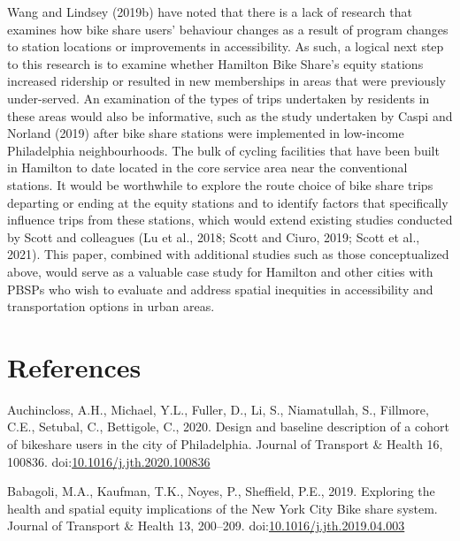 \documentclass[]{elsarticle} %
\begin{document}
Wang and Lindsey (2019b) have noted that there is a lack of research
that examines how bike share users' behaviour changes as a result of
program changes to station locations or improvements in accessibility.
As such, a logical next step to this research is to examine whether
Hamilton Bike Share's equity stations increased ridership or resulted in
new memberships in areas that were previously under-served. An
examination of the types of trips undertaken by residents in these areas
would also be informative, such as the study undertaken by Caspi and
Norland (2019) after bike share stations were implemented in low-income
Philadelphia neighbourhoods. The bulk of cycling facilities that have
been built in Hamilton to date located in the core service area near the
conventional stations. It would be worthwhile to explore the route
choice of bike share trips departing or ending at the equity stations
and to identify factors that specifically influence trips from these
stations, which would extend existing studies conducted by Scott and
colleagues (Lu et al., 2018; Scott and Ciuro, 2019; Scott et al., 2021).
This paper, combined with additional studies such as those
conceptualized above, would serve as a valuable case study for Hamilton
and other cities with PBSPs who wish to evaluate and address spatial
inequities in accessibility and transportation options in urban areas.

\hypertarget{references}{%
\section*{References}\label{references}}

\hypertarget{refs}{}
\leavevmode\hypertarget{ref-auchinclossDesignBaselineDescription2020}{}%
Auchincloss, A.H., Michael, Y.L., Fuller, D., Li, S., Niamatullah, S.,
Fillmore, C.E., Setubal, C., Bettigole, C., 2020. Design and baseline
description of a cohort of bikeshare users in the city of Philadelphia.
Journal of Transport \& Health 16, 100836.
doi:\href{https://doi.org/10.1016/j.jth.2020.100836}{10.1016/j.jth.2020.100836}

\leavevmode\hypertarget{ref-babagoliExploringHealthSpatial2019}{}%
Babagoli, M.A., Kaufman, T.K., Noyes, P., Sheffield, P.E., 2019.
Exploring the health and spatial equity implications of the New York
City Bike share system. Journal of Transport \& Health 13, 200--209.
doi:\href{https://doi.org/10.1016/j.jth.2019.04.003}{10.1016/j.jth.2019.04.003}
\end{document}
